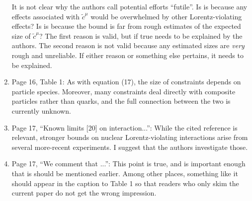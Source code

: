 \documentclass[12pt,preprintnumbers,nofootinbib]{revtex4}
\begin{document}
\begin{enumerate}
 It is not clear why the authors call potential efforts ``futile''.
 Is is because any effects associated with $\tilde{c}^\mu$ would be overwhelmed
 by other Lorentz-violating effects?
 Is is because the bound is far from rough estimates of the expected size of
$\tilde{c}^\mu$?
 The first reason is valid, but if true needs to be explained by the authors.
 The second reason is not valid because any estimated sizes are {\itshape very}
rough and unreliable.
 If either reason or something else pertains, it needs to be explained.
\item Page 16, Table 1:
 As with equation (17), the size of constraints depends on particle species.
 Moreover, many constraints deal directly with composite particles
 rather than quarks,
 and the full connection between the two is currently unknown.
\item Page 17, ``Known limits [20] on interaction...'':
 While the cited reference is relevant,
 stronger bounds on nuclear Lorentz-violating interactions
 arise from several more-recent experiments.
 I suggest that the authors investigate those.
\item Page 17, ``We comment that ...'':
 This point is true, and is important enough that is should be mentioned
earlier.
 Among other places, something like it should appear in the caption to Table 1
 so that readers who only skim the current paper do not get the wrong
impression.  
\end{enumerate}
\end{document}
